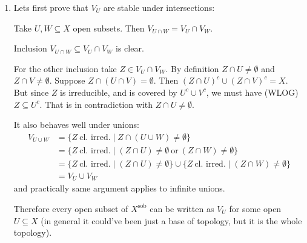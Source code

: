 \begin{exercise}{4}
    \begin{enumerate}
        \item{
                Lets first prove that $V_{U}$ are stable under
                intersections:
                \begin{claim}
                    Take $U, W \subseteq X$ open subsets. Then $V_{U \cap W} =
                    V_U \cap V_W$.
                \end{claim}
                \begin{proof_claim}
                    Inclusion $V_{U \cap W} \subseteq V_U \cap
                    V_W$ is clear.

                    For the other inclusion take $Z \in V_U \cap V_W$. By
                    definition $Z \cap U \not= \emptyset$ and $Z \cap V \not=
                    \emptyset$. Suppose $Z \cap (U \cap V) = \emptyset$. Then
                    $(Z \cap U)^c \cup (Z \cap V)^c = X$. But since $Z$ is
                    irreducible, and is covered by $U^c \cup V^c$, we must have
                    (WLOG) $Z \subseteq U^c$. That is in contradiction with
                    $Z \cap U \not= \emptyset$. 
                \end{proof_claim}

                It also behaves well under unions:
                \begin{align*}
                    V_{U \cup W} &= \{ Z\ \text{cl. irred.} \mid Z \cap (U \cup
                    W) \not= \emptyset \} \\
                    &= \{ Z\ \text{cl. irred.} \mid (Z \cap U) \not= \emptyset
                    \ \text{or}\ (Z \cap W) \not= \emptyset \} \\
                    &= \{ Z\ \text{cl. irred.} \mid (Z \cap U) \not= \emptyset
                    \} \cup \{ Z\ \text{cl. irred.} \mid (Z \cap W) \not=
                    \emptyset \} \\
                    &= V_U \cup V_W
                \end{align*}
                and practically same argument applies to infinite unions.

                Therefore every open subset of $X^{\text{sob}}$ can be written
                as $V_U$ for some open $U \subseteq X$ (in general it could've
                been just a base of topology, but it is the whole topology).

}
\end{enumerate}
\end{exercise}
